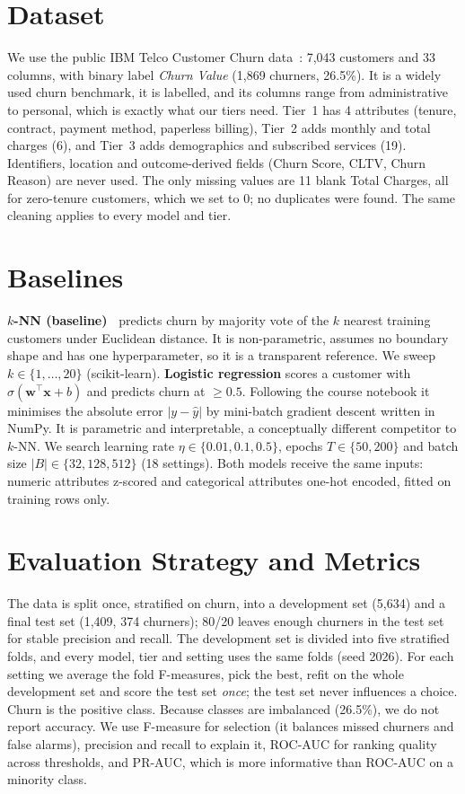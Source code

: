 \documentclass[sigconf,nonacm]{acmart}
\begin{document}
\section{Dataset}
We use the public IBM Telco Customer Churn data~\cite{ibmtelco}: 7,043 customers and 33 columns, with binary label \emph{Churn Value} (1,869 churners, 26.5\%). It is a widely used churn benchmark, it is labelled, and its columns range from administrative to personal, which is exactly what our tiers need. Tier~1 has 4 attributes (tenure, contract, payment method, paperless billing), Tier~2 adds monthly and total charges (6), and Tier~3 adds demographics and subscribed services (19). Identifiers, location and outcome-derived fields (Churn Score, CLTV, Churn Reason) are never used. The only missing values are 11 blank Total Charges, all for zero-tenure customers, which we set to 0; no duplicates were found. The same cleaning applies to every model and tier.

\section{Baselines}
\textbf{$k$-NN (baseline)~\cite{coverhart}} predicts churn by majority vote of the $k$ nearest training customers under Euclidean distance. It is non-parametric, assumes no boundary shape and has one hyperparameter, so it is a transparent reference. We sweep $k\in\{1,\dots,20\}$ (scikit-learn).
\textbf{Logistic regression} scores a customer with $\sigma(\mathbf{w}^\top\mathbf{x}+b)$ and predicts churn at $\ge0.5$. Following the course notebook it minimises the absolute error $|y-\hat y|$ by mini-batch gradient descent written in NumPy. It is parametric and interpretable, a conceptually different competitor to $k$-NN. We search learning rate $\eta\in\{0.01,0.1,0.5\}$, epochs $T\in\{50,200\}$ and batch size $|B|\in\{32,128,512\}$ (18 settings). Both models receive the same inputs: numeric attributes z-scored and categorical attributes one-hot encoded, fitted on training rows only.

\section{Evaluation Strategy and Metrics}
The data is split once, stratified on churn, into a development set (5,634) and a final test set (1,409, 374 churners); 80/20 leaves enough churners in the test set for stable precision and recall. The development set is divided into five stratified folds, and every model, tier and setting uses the same folds (seed 2026). For each setting we average the fold F-measures, pick the best, refit on the whole development set and score the test set \emph{once}; the test set never influences a choice. Churn is the positive class. Because classes are imbalanced (26.5\%), we do not report accuracy. We use F-measure for selection (it balances missed churners and false alarms), precision and recall to explain it, ROC-AUC for ranking quality across thresholds, and PR-AUC, which is more informative than ROC-AUC on a minority class.
\end{document}
